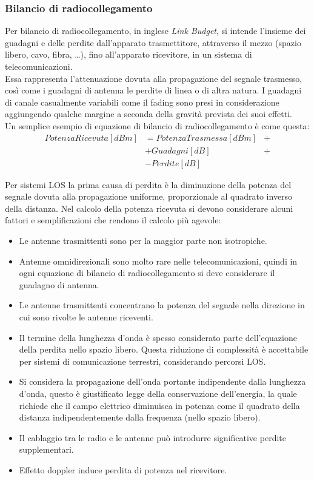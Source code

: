 \subsubsection{Bilancio di radiocollegamento}
\label{cap:bilancio}
Per bilancio di radiocollegamento, in inglese \emph{Link Budget}, si intende l'insieme dei guadagni e delle perdite dall'apparato
trasmettitore, attraverso il mezzo (spazio libero, cavo, fibra, \ldots), fino all'apparato ricevitore, in un sistema di telecomunicazioni. \\
Essa rappresenta l'attenuazione dovuta alla propagazione del segnale trasmesso, così come i guadagni di antenna le perdite di linea o 
di altra natura.
I guadagni di canale casualmente variabili come il fading sono presi in considerazione aggiungendo qualche margine a seconda della gravità 
prevista dei suoi effetti.
\\[1cm]
Un semplice esempio di equazione di bilancio di radiocollegamento è come questa:
\begin{align*}
Potenza Ricevuta [dBm] &= Potenza Trasmessa [dBm] &+ \\
&+ Guadagni [dB] &+ \\
&- Perdite [dB]
\end{align*}

Per sistemi \ac{LOS} la prima causa di perdita è la diminuzione della potenza del segnale dovuta alla propagazione uniforme, proporzionale
al quadrato inverso della distanza. Nel calcolo della potenza ricevuta si devono considerare alcuni fattori e semplificazioni che rendono
il calcolo più agevole:
\begin{itemize}
\item Le antenne trasmittenti sono per la maggior parte non isotropiche.
\item Antenne omnidirezionali sono molto rare nelle telecomunicazioni, quindi in ogni equazione di bilancio di radiocollegamento si deve
considerare il guadagno di antenna.
\item  Le antenne trasmittenti concentrano la potenza del segnale nella direzione in cui sono rivolte le antenne riceventi.
\item Il termine della lunghezza d'onda è spesso considerato parte dell'equazione della perdita nello spazio libero. 
Questa riduzione di complessità è accettabile per sistemi di comunicazione terrestri, considerando percorsi \ac{LOS}.
\item Si considera la propagazione dell'onda portante indipendente dalla lunghezza d'onda, questo è giustificato legge della 
conservazione dell'energia, la quale richiede che il campo elettrico diminuisca in potenza come il quadrato della distanza 
indipendentemente dalla frequenza (nello spazio libero).
\item Il cablaggio tra le radio e le antenne può introdurre significative perdite supplementari.
\item Effetto doppler induce perdita di potenza nel ricevitore. 
\end{itemize}
